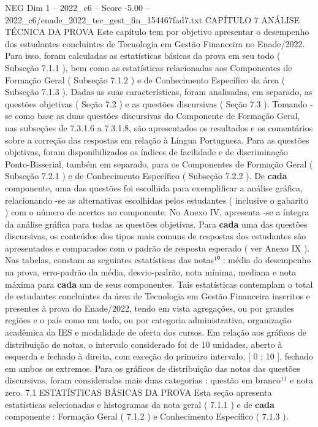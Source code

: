 \begin{textsample}{NEG Dim 1 – 2022\_c6 – Score -5.00 – 2022\_c6/enade\_2022\_tec\_gest\_fin\_154467fad7.txt}  \label{ex:f1_neg_184}
CAPÍTULO 7 ANÁLISE TÉCNICA DA PROVA Este capítulo tem por objetivo apresentar o desempenho dos estudantes concluintes de Tecnologia em Gestão Financeira no Enade/2022.
Para isso, foram calculadas as estatísticas básicas da prova em seu todo ( Subseção 7.1.1 ), bem como as estatísticas relacionadas aos Componentes de Formação Geral ( Subseção 7.1.2 ) e de Conhecimento Específico da área ( Subseção 7.1.3 ).
Dadas as suas características, foram analisadas, em separado, as questões objetivas ( Seção 7.2 ) e as questões discursivas ( Seção 7.3 ).
Tomando -se como base as duas questões discursivas do Componente de Formação Geral, nas subseções de 7.3.1.6 a 7.3.1.8, são apresentados os resultados e os comentários sobre a correção das respostas em relação à Língua Portuguesa.
Para as questões objetivas, foram disponibilizados os índices de facilidade e de discriminação Ponto-Bisserial, também em separado, para os Componentes de Formação Geral ( Subseção 7.2.1 ) e de Conhecimento Específico ( Subseção 7.2.2 ).
De \textbf{cada} componente, uma das questões foi escolhida para exemplificar a análise gráfica, relacionando -se as alternativas escolhidas pelos estudantes ( inclusive o gabarito ) com o número de acertos no componente.
No Anexo IV, apresenta -se a íntegra da análise gráfica para todas as questões objetivas.
Para \textbf{cada} uma das questões discursivas, os conteúdos dos tipos mais comuns de respostas dos estudantes são apresentados e comparados com o padrão de resposta esperado ( ver Anexo IX ).
Nas tabelas, constam as seguintes estatísticas das notas¹⁰ : média do desempenho na prova, erro-padrão da média, desvio-padrão, nota mínima, mediana e nota máxima para \textbf{cada} um de seus componentes.
Tais estatísticas contemplam o total de estudantes concluintes da área de Tecnologia em Gestão Financeira inscritos e presentes à prova do Enade/2022, tendo em vista agregações, ou por grandes regiões e o país como um todo, ou por categoria administrativa, organização acadêmica da IES e modalidade de oferta dos cursos.
Em relação aos gráficos de distribuição de notas, o intervalo considerado foi de 10 unidades, aberto à esquerda e fechado à direita, com exceção do primeiro intervalo, [ 0 ; 10 ], fechado em ambos os extremos.
Para os gráficos de distribuição das notas das questões discursivas, foram consideradas mais duas categorias : questão em branco¹¹ e nota zero. 7.1 ESTATÍSTICAS BÁSICAS DA PROVA Esta seção apresenta estatísticas selecionadas e histogramas da nota geral ( 7.1.1 ) e de \textbf{cada} componente : Formação Geral ( 7.1.2 ) e Conhecimento Específico ( 7.1.3 ).

\end{textsample}
